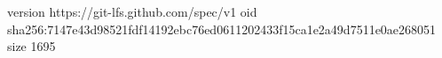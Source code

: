 version https://git-lfs.github.com/spec/v1
oid sha256:7147e43d98521fdf14192ebc76ed0611202433f15ca1e2a49d7511e0ae268051
size 1695
